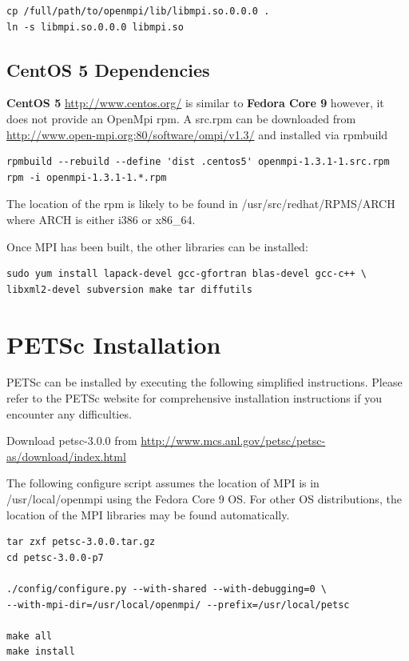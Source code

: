 \documentclass[12pt]{article}
\begin{document}
\begin{Verbatim}
cp /full/path/to/openmpi/lib/libmpi.so.0.0.0 .
ln -s libmpi.so.0.0.0 libmpi.so
\end{Verbatim}


\subsection{CentOS 5 Dependencies}

\textbf{CentOS 5} \url{http://www.centos.org/} is similar to \textbf{Fedora
Core 9} however, it does not provide an OpenMpi rpm.  A src.rpm can be
downloaded from \url{http://www.open-mpi.org:80/software/ompi/v1.3/}
and installed via rpmbuild

\begin{Verbatim}
rpmbuild --rebuild --define 'dist .centos5' openmpi-1.3.1-1.src.rpm
rpm -i openmpi-1.3.1-1.*.rpm
\end{Verbatim}
The location of the rpm is likely to be found in
/usr/src/redhat/RPMS/ARCH where ARCH is either i386 or x86\_64.

Once MPI has been built, the other libraries can be installed:
\begin{verbatim}
sudo yum install lapack-devel gcc-gfortran blas-devel gcc-c++ \
libxml2-devel subversion make tar diffutils
\end{verbatim}


\section{PETSc Installation}

PETSc can be installed by executing the following simplified
instructions.  Please refer to the PETSc website for comprehensive
installation instructions if you encounter any difficulties.

Download petsc-3.0.0 from
\url{http://www.mcs.anl.gov/petsc/petsc-as/download/index.html}

The following configure script assumes the location of MPI is in
/usr/local/openmpi using the Fedora Core 9 OS.  For other OS
distributions, the location of the MPI libraries may be found
automatically.

\begin{Verbatim}
tar zxf petsc-3.0.0.tar.gz
cd petsc-3.0.0-p7

./config/configure.py --with-shared --with-debugging=0 \ 
--with-mpi-dir=/usr/local/openmpi/ --prefix=/usr/local/petsc

make all
make install
\end{Verbatim}
\end{document}
